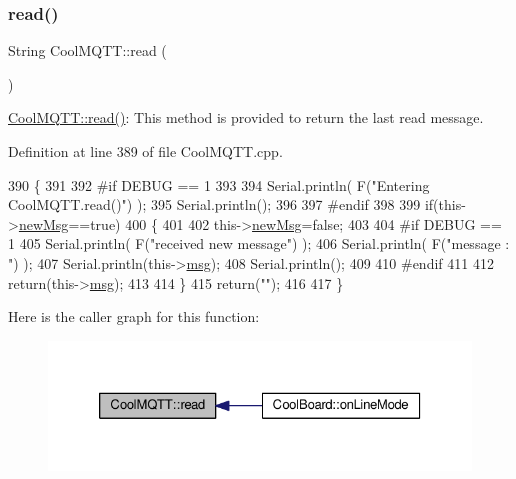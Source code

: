\subsubsection{\texorpdfstring{read()}{read()}}
{\footnotesize\ttfamily String Cool\+M\+Q\+T\+T\+::read (\begin{DoxyParamCaption}{ }\end{DoxyParamCaption})}

\hyperlink{class_cool_m_q_t_t_ae3c18f6ae9723746d32765f1c8f176ca}{Cool\+M\+Q\+T\+T\+::read()}\+: This method is provided to return the last read message. 

Definition at line 389 of file Cool\+M\+Q\+T\+T.\+cpp.


\begin{DoxyCode}
390 \{   
391 
392 \textcolor{preprocessor}{#if DEBUG == 1 }
393 
394     Serial.println( F(\textcolor{stringliteral}{"Entering CoolMQTT.read()"}) );
395     Serial.println();
396 
397 \textcolor{preprocessor}{#endif }
398 
399     \textcolor{keywordflow}{if}(this->\hyperlink{class_cool_m_q_t_t_a3240388137b885775aadf38e96b24c6b}{newMsg}==\textcolor{keyword}{true})
400     \{
401         
402         this->\hyperlink{class_cool_m_q_t_t_a3240388137b885775aadf38e96b24c6b}{newMsg}=\textcolor{keyword}{false};
403 
404 \textcolor{preprocessor}{#if DEBUG == 1 }
405         Serial.println( F(\textcolor{stringliteral}{"received new message"}) );
406         Serial.println( F(\textcolor{stringliteral}{"message : "}) );
407         Serial.println(this->\hyperlink{class_cool_m_q_t_t_af6b19e7074dbbb4ae493c44dcb53f7ff}{msg});
408         Serial.println();
409 
410 \textcolor{preprocessor}{#endif}
411 
412         \textcolor{keywordflow}{return}(this->\hyperlink{class_cool_m_q_t_t_af6b19e7074dbbb4ae493c44dcb53f7ff}{msg});
413         
414     \}
415     \textcolor{keywordflow}{return}(\textcolor{stringliteral}{""});
416 
417 \}
\end{DoxyCode}
Here is the caller graph for this function\+:\nopagebreak
\begin{figure}[H]
\begin{center}
\leavevmode
\includegraphics[width=326pt]{d0/dd0/class_cool_m_q_t_t_ae3c18f6ae9723746d32765f1c8f176ca_icgraph}
\end{center}
\end{figure}
\mbox{\label{class_cool_m_q_t_t_a5d003307eff78efbd585e42b43b72b6d}} 
